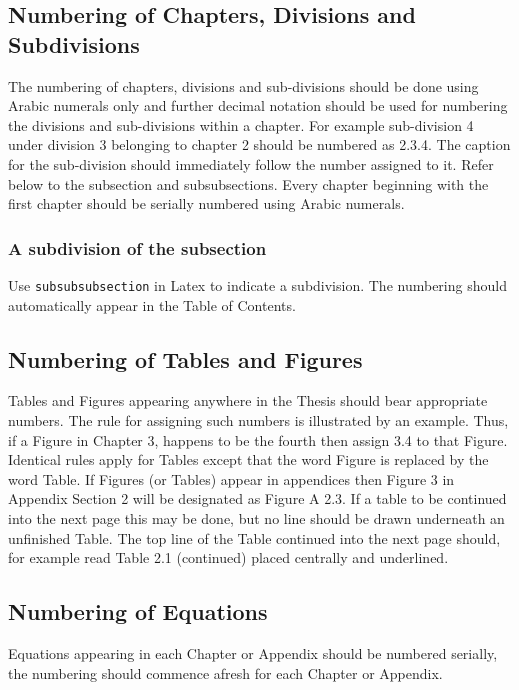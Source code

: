 \subsection{Numbering of Chapters, Divisions and Subdivisions}
The numbering of chapters, divisions and sub-divisions should be done using Arabic numerals only and further decimal notation should be used for numbering the divisions and sub-divisions within a chapter. For example sub-division 4 under division 3 belonging to chapter 2 should be numbered as 2.3.4. The caption for the sub-division should immediately follow the number assigned to it. Refer below to the subsection and subsubsections. Every chapter beginning with the first chapter should be serially numbered using Arabic numerals.
\subsubsection{A subdivision of the subsection}
Use \texttt{subsubsubsection} in Latex to indicate a subdivision. The numbering should automatically appear in the Table of Contents.
\subsection{Numbering of Tables and Figures}
Tables and Figures appearing anywhere in the Thesis should bear appropriate numbers. The rule for assigning such numbers is illustrated by an example. Thus, if a Figure in Chapter 3, happens to be the fourth then assign 3.4 to that Figure. Identical rules apply for Tables except that the word Figure is replaced by the word Table. If Figures (or Tables) appear in appendices then Figure 3 in Appendix Section 2 will be designated as Figure A 2.3. If a table to be continued into the next page this may be done, but no line should be drawn underneath an unfinished Table. The top line of the Table continued into the next page should, for example read Table 2.1
(continued) placed centrally and underlined.

\subsection{Numbering of Equations}
Equations appearing in each Chapter or Appendix should be numbered serially, the numbering should commence afresh for each Chapter or Appendix.
